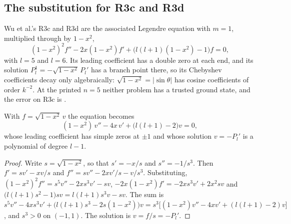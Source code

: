 \subsection{The substitution for R3c and R3d}
\label{app:legendre-substitution}

Wu et al.'s R3c and R3d are the associated Legendre equation with $m=1$, multiplied through by $1-x^2$,
\begin{equation*}
    (1-x^2)^2f''-2x(1-x^2)f'+\bigl(l(l+1)(1-x^2)-1\bigr)f=0,
\end{equation*}
with $l=5$ and $l=6$. Its leading coefficient has a double zero at each end, and its solution $P_l^1=-\sqrt{1-x^2}\,P_l'$ has a branch point there, so its Chebyshev coefficients decay only algebraically: $\sqrt{1-x^2}=|\sin\theta|$ has cosine coefficients of order $k^{-2}$. At the printed $n=5$ neither problem has a trusted ground state, and the error on R3c is .

\begin{proposition}
\label{prop:legendre-substitution}
With $f=\sqrt{1-x^2}\,v$ the equation becomes
\begin{equation}
    (1-x^2)\,v''-4x\,v'+\bigl(l(l+1)-2\bigr)v=0,
    \label{eq:app-legendre-v}
\end{equation}
whose leading coefficient has simple zeros at $\pm1$ and whose solution $v=-P_l'$ is a polynomial of degree $l-1$.
\end{proposition}
\begin{proof}
Write $s=\sqrt{1-x^2}$, so that $s'=-x/s$ and $s''=-1/s^3$. Then $f'=sv'-xv/s$ and $f''=sv''-2xv'/s-v/s^3$. Substituting, $(1-x^2)^2f''=s^5v''-2xs^3v'-sv$, $-2x(1-x^2)f'=-2xs^3v'+2x^2sv$ and $\bigl(l(l+1)s^2-1\bigr)sv=l(l+1)s^3v-sv$. The sum is $s^5v''-4xs^3v'+\bigl(l(l+1)s^3-2s(1-x^2)\bigr)v=s^3\bigl[(1-x^2)v''-4xv'+(l(l+1)-2)v\bigr]$, and $s^3>0$ on $(-1,1)$. The solution is $v=f/s=-P_l'$.
\end{proof}

